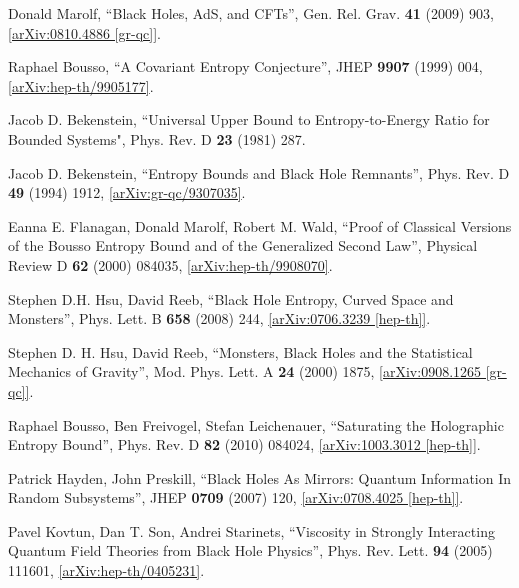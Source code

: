 \documentclass[12pt]{article}
\newcommand{\2}{$^2$}
\newcommand{\3}{$^3$}
\newcommand{\4}{$_4$}
\newcommand{\5}{$_5$}
\newcommand{\x}{arXiv:}
\begin{document}
\begin{thebibliography}{400}
Donald Marolf, ``Black Holes, AdS, and CFTs'', Gen. Rel. Grav. \textbf{41} (2009) 903, \href{http://arxiv.org/abs/0810.4886}{[arXiv:0810.4886 [gr-qc]]}.


Raphael Bousso, ``A Covariant Entropy Conjecture'', JHEP \textbf{9907} (1999) 004, \href{http://arxiv.org/abs/hep-th/9905177}{[arXiv:hep-th/9905177]}. 

Jacob D. Bekenstein, ``Universal Upper Bound to Entropy-to-Energy Ratio for Bounded Systems", Phys. Rev. D \textbf{23} (1981) 287.

Jacob D. Bekenstein, ``Entropy Bounds and Black Hole Remnants'', Phys. Rev. D \textbf{49} (1994) 1912, \href{http://arxiv.org/abs/gr-qc/9307035v1}{[arXiv:gr-qc/9307035]}.

Eanna E. Flanagan, Donald Marolf, Robert M. Wald, ``Proof of Classical Versions of the Bousso
Entropy Bound and of the Generalized Second Law'', Physical Review D \textbf{62} (2000) 084035,
\href{http://xxx.lanl.gov/abs/hep-th/9908070}{[arXiv:hep-th/9908070]}.

Stephen D.H. Hsu, David Reeb, ``Black Hole Entropy, Curved Space and Monsters'', 	Phys. Lett. B \textbf{658} (2008) 244, \href{http://arxiv.org/abs/0706.3239}{[arXiv:0706.3239 [hep-th]]}.

Stephen D. H. Hsu, David Reeb, ``Monsters, Black Holes and the Statistical Mechanics of Gravity'', Mod. Phys. Lett. A \textbf{24} (2000) 1875, \href{http://arxiv.org/abs/0908.1265}{[arXiv:0908.1265 [gr-qc]]}.


Raphael Bousso, Ben Freivogel, Stefan Leichenauer, ``Saturating the Holographic Entropy Bound'', 	Phys. Rev. D \textbf{82} (2010) 084024, \href{http://arxiv.org/abs/1003.3012}{[arXiv:1003.3012 [hep-th]]}. 

Patrick Hayden, John Preskill, ``Black Holes As Mirrors: Quantum Information In Random Subsystems'', JHEP \textbf{0709} (2007) 120, \href{http://arxiv.org/abs/0708.4025}{[arXiv:0708.4025 [hep-th]]}.

Pavel Kovtun, Dan T. Son, Andrei Starinets, ``Viscosity in Strongly Interacting Quantum Field Theories from Black Hole Physics'',
Phys. Rev. Lett. \textbf{94} (2005) 111601, \href{http://arxiv.org/abs/hep-th/0405231}{[\x hep-th/0405231]}.


\end{thebibliography}
\end{document}
